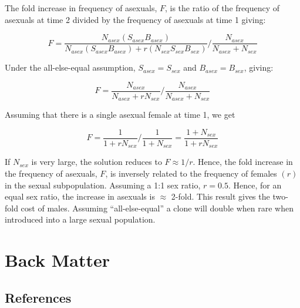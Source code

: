 \documentclass[
  letterpaper,
]{book}
\newlength{\cslhangindent}
\newlength{\cslentryspacingunit} %
\newenvironment{CSLReferences}[2] %
 {%
  \setlength{\parindent}{0pt}
  \ifodd #1
  \let\oldpar\par
  \def\par{\hangindent=\cslhangindent\oldpar}
  \fi
  \setlength{\parskip}{#2\cslentryspacingunit}
 }%
 {}
\begin{document}
\begin{tcolorbox}
The fold increase in frequency of asexuals, \(F\), is the ratio of the
frequency of asexuals at time 2 divided by the frequency of asexuals at
time 1 giving:

\[F = \frac{N_{asex}(S_{asex}B_{asex})}{N_{asex}(S_{asex}B_{asex}) + r(N_{sex}S_{sex}B_{sex})}/\frac{N_{asex}}{N_{asex} + N_{sex}}\]

Under the all-else-equal assumption, \(S_{asex} = S_{sex}\) and
\(B_{asex} = B_{sex}\), giving:

\[F = \frac{N_{asex}}{N_{asex} + rN_{sex}}/\frac{N_{asex}}{N_{asex} + N_{sex}}\]

Assuming that there is a single asexual female at time 1, we get

\[F = \frac{1}{1 + rN_{sex}}/\frac{1}{1 + N_{sex}} = \frac{1 + N_{sex}}{1 + rN_{sex}}\]

If \(N_{sex}\) is very large, the solution reduces to \(F \approx 1/r\).
Hence, the fold increase in the frequency of asexuals, \(F\), is
inversely related to the frequency of females \((r)\) in the sexual
subpopulation. Assuming a 1:1 sex ratio, \(r = 0.5\). Hence, for an
equal sex ratio, the increase in asexuals is \(\approx\) 2-fold. This
result gives the two-fold cost of males. Assuming ``all-else-equal'' a
clone will double when rare when introduced into a large sexual
population.

\end{tcolorbox}


\part{Back Matter}

\hypertarget{references}{%
\chapter*{References}\label{references}}


\hypertarget{refs}{}
\begin{CSLReferences}{0}{0}
\end{CSLReferences}


\backmatter
\end{document}
